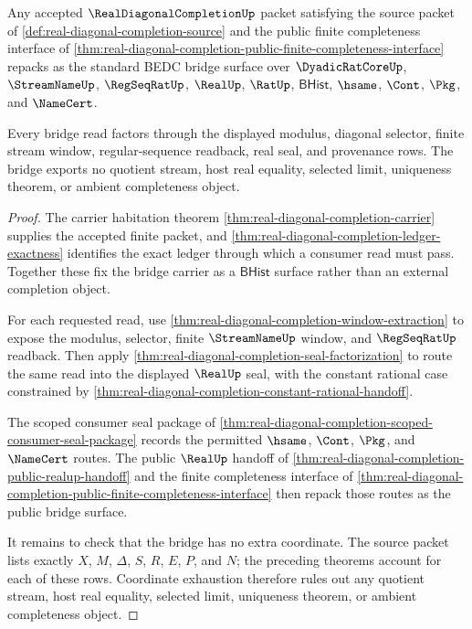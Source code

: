 \begin{theorem}
\label{thm:real-diagonal-completion-standard-finite-bridge}
Any accepted $\RealDiagonalCompletionUp$ packet satisfying the source packet of \autoref{def:real-diagonal-completion-source} and the public finite completeness interface of \autoref{thm:real-diagonal-completion-public-finite-completeness-interface} repacks as the standard BEDC bridge surface over $\DyadicRatCoreUp$, $\StreamNameUp$, $\RegSeqRatUp$, $\RealUp$, $\RatUp$, $\mathsf{BHist}$, $\hsame$, $\Cont$, $\Pkg$, and $\NameCert$.

Every bridge read factors through the displayed modulus, diagonal selector, finite stream window, regular-sequence readback, real seal, and provenance rows. The bridge exports no quotient stream, host real equality, selected limit, uniqueness theorem, or ambient completeness object.
\end{theorem}
\begin{proof}
The carrier habitation theorem \autoref{thm:real-diagonal-completion-carrier} supplies the accepted finite packet, and \autoref{thm:real-diagonal-completion-ledger-exactness} identifies the exact ledger through which a consumer read must pass. Together these fix the bridge carrier as a $\mathsf{BHist}$ surface rather than an external completion object.

For each requested read, use \autoref{thm:real-diagonal-completion-window-extraction} to expose the modulus, selector, finite $\StreamNameUp$ window, and $\RegSeqRatUp$ readback. Then apply \autoref{thm:real-diagonal-completion-seal-factorization} to route the same read into the displayed $\RealUp$ seal, with the constant rational case constrained by \autoref{thm:real-diagonal-completion-constant-rational-handoff}.

The scoped consumer seal package of \autoref{thm:real-diagonal-completion-scoped-consumer-seal-package} records the permitted $\hsame$, $\Cont$, $\Pkg$, and $\NameCert$ routes. The public $\RealUp$ handoff of \autoref{thm:real-diagonal-completion-public-realup-handoff} and the finite completeness interface of \autoref{thm:real-diagonal-completion-public-finite-completeness-interface} then repack those routes as the public bridge surface.

It remains to check that the bridge has no extra coordinate. The source packet lists exactly $X$, $M$, $\Delta$, $S$, $R$, $E$, $P$, and $N$; the preceding theorems account for each of these rows. Coordinate exhaustion therefore rules out any quotient stream, host real equality, selected limit, uniqueness theorem, or ambient completeness object.
\end{proof}

